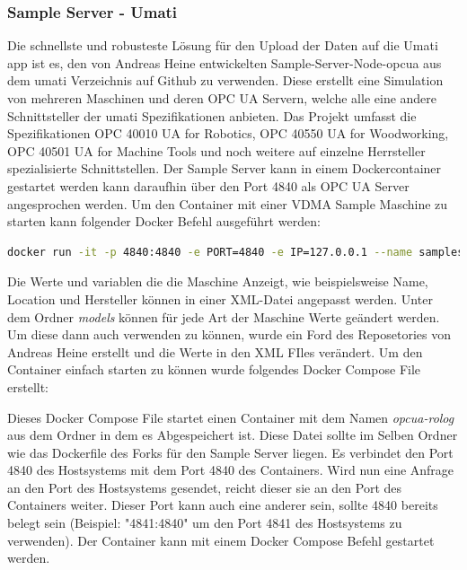 \documentclass[a4paper, 12pt, oneside]{scrbook}
\begin{document}
			
			\subsubsection{Sample Server - Umati}			
			
			Die schnellste und robusteste Lösung für den Upload der Daten auf die Umati app ist es, den von Andreas Heine entwickelten Sample-Server-Node-opcua aus dem umati Verzeichnis auf Github zu verwenden. Diese erstellt eine Simulation von mehreren Maschinen und deren OPC UA Servern, welche alle eine andere Schnittsteller der umati Spezifikationen anbieten. Das Projekt umfasst die Spezifikationen OPC 40010 UA for Robotics, OPC 40550 UA for Woodworking, OPC 40501 UA for Machine Tools und noch weitere auf einzelne Herrsteller spezialisierte Schnittstellen. Der Sample Server kann in einem Dockercontainer gestartet werden kann daraufhin über den Port 4840 als OPC UA Server angesprochen werden. Um den Container mit einer VDMA Sample Maschine zu starten kann folgender Docker Befehl ausgeführt werden:
			
			\begin{lstlisting}[numbers=none, language=bash, frame=single]
docker run -it -p 4840:4840 -e PORT=4840 -e IP=127.0.0.1 --name sampleserver-node-opcua ghcr.io/andreasheine/sampleserver-node-opcua:main
			\end{lstlisting}
			
			Die Werte und variablen die die Maschine Anzeigt, wie beispielsweise Name, Location und Hersteller können in einer XML-Datei angepasst werden. Unter dem Ordner \textit{models} können für jede Art der Maschine Werte geändert werden. Um diese dann auch verwenden zu können, wurde ein Ford des Reposetories von Andreas Heine erstellt und die Werte in den XML FIles verändert. Um den Container einfach starten zu können wurde folgendes Docker Compose File erstellt:
			
			
			
			Dieses Docker Compose File startet einen Container mit dem Namen \textit{opcua-rolog} aus dem Ordner in dem es Abgespeichert ist. Diese Datei sollte im Selben Ordner wie das Dockerfile des Forks für den Sample Server liegen. Es verbindet den Port 4840 des Hostsystems mit dem Port 4840 des Containers. Wird nun eine Anfrage an den Port des Hostsystems gesendet, reicht dieser sie an den Port des Containers weiter. Dieser Port kann auch eine anderer sein, sollte 4840 bereits belegt sein (Beispiel: "4841:4840" um den Port 4841 des Hostsystems zu verwenden). Der Container kann mit einem Docker Compose Befehl gestartet werden. 
			
\end{document}
